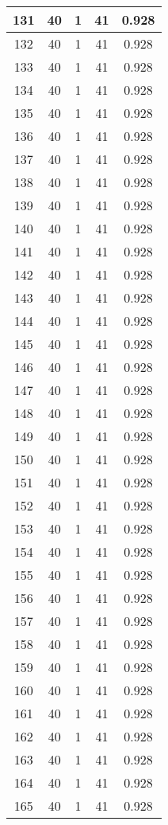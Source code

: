 \documentclass[letterpaper, 12pt]{article}
\begin{document}
\begin{longtable}{|c|c|c|c|c|}
\hline
131 & 40 & 1 & 41 & 0.928 \\
\hline
132 & 40 & 1 & 41 & 0.928 \\
\hline
133 & 40 & 1 & 41 & 0.928 \\
\hline
134 & 40 & 1 & 41 & 0.928 \\
\hline
135 & 40 & 1 & 41 & 0.928 \\
\hline
136 & 40 & 1 & 41 & 0.928 \\
\hline
137 & 40 & 1 & 41 & 0.928 \\
\hline
138 & 40 & 1 & 41 & 0.928 \\
\hline
139 & 40 & 1 & 41 & 0.928 \\
\hline
140 & 40 & 1 & 41 & 0.928 \\
\hline
141 & 40 & 1 & 41 & 0.928 \\
\hline
142 & 40 & 1 & 41 & 0.928 \\
\hline
143 & 40 & 1 & 41 & 0.928 \\
\hline
144 & 40 & 1 & 41 & 0.928 \\
\hline
145 & 40 & 1 & 41 & 0.928 \\
\hline
146 & 40 & 1 & 41 & 0.928 \\
\hline
147 & 40 & 1 & 41 & 0.928 \\
\hline
148 & 40 & 1 & 41 & 0.928 \\
\hline
149 & 40 & 1 & 41 & 0.928 \\
\hline
150 & 40 & 1 & 41 & 0.928 \\
\hline
151 & 40 & 1 & 41 & 0.928 \\
\hline
152 & 40 & 1 & 41 & 0.928 \\
\hline
153 & 40 & 1 & 41 & 0.928 \\
\hline
154 & 40 & 1 & 41 & 0.928 \\
\hline
155 & 40 & 1 & 41 & 0.928 \\
\hline
156 & 40 & 1 & 41 & 0.928 \\
\hline
157 & 40 & 1 & 41 & 0.928 \\
\hline
158 & 40 & 1 & 41 & 0.928 \\
\hline
159 & 40 & 1 & 41 & 0.928 \\
\hline
160 & 40 & 1 & 41 & 0.928 \\
\hline
161 & 40 & 1 & 41 & 0.928 \\
\hline
162 & 40 & 1 & 41 & 0.928 \\
\hline
163 & 40 & 1 & 41 & 0.928 \\
\hline
164 & 40 & 1 & 41 & 0.928 \\
\hline
165 & 40 & 1 & 41 & 0.928 \\

\end{longtable}
\end{document}
